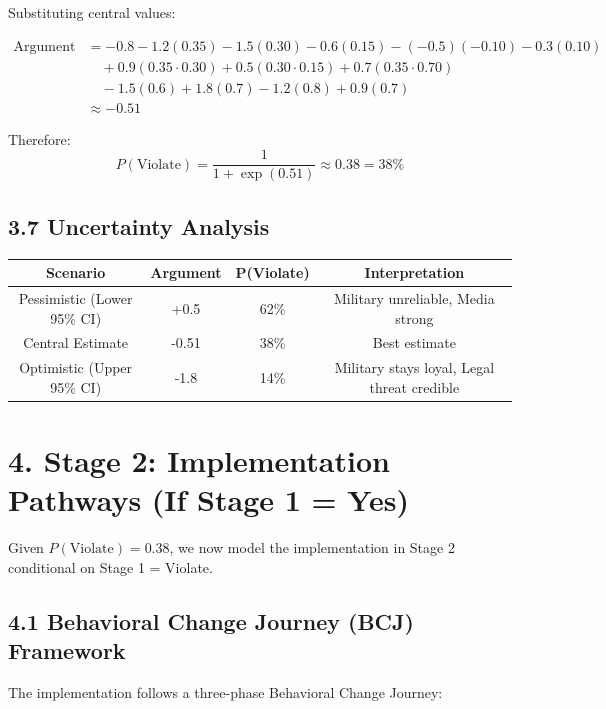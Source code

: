 \documentclass[11pt]{article}
\begin{document}
Substituting central values:

\begin{align}
\text{Argument} &= -0.8 - 1.2(0.35) - 1.5(0.30) - 0.6(0.15) - (-0.5)(-0.10) - 0.3(0.10) \\
&\quad + 0.9(0.35 \cdot 0.30) + 0.5(0.30 \cdot 0.15) + 0.7(0.35 \cdot 0.70) \\
&\quad - 1.5(0.6) + 1.8(0.7) - 1.2(0.8) + 0.9(0.7) \\
&\approx -0.51
\end{align}

Therefore:
\begin{equation}
P(\text{Violate}) = \frac{1}{1 + \exp(0.51)} \approx 0.38 = \boxed{38\%}
\end{equation}

\subsection{3.7 Uncertainty Analysis}

\begin{table}[h]
\centering
\begin{tabular}{|c|c|c|c|}
\hline
\textbf{Scenario} & \textbf{Argument} & \textbf{P(Violate)} & \textbf{Interpretation} \\
\hline
Pessimistic (Lower 95\% CI) & +0.5 & 62\% & Military unreliable, Media strong \\
Central Estimate & -0.51 & 38\% & Best estimate \\
Optimistic (Upper 95\% CI) & -1.8 & 14\% & Military stays loyal, Legal threat credible \\
\hline
\end{tabular}
\end{table}

\section{4. Stage 2: Implementation Pathways (If Stage 1 = Yes)}

Given $P(\text{Violate}) = 0.38$, we now model the implementation in Stage 2 conditional on Stage 1 = Violate.

\subsection{4.1 Behavioral Change Journey (BCJ) Framework}

The implementation follows a three-phase Behavioral Change Journey:
\end{document}
